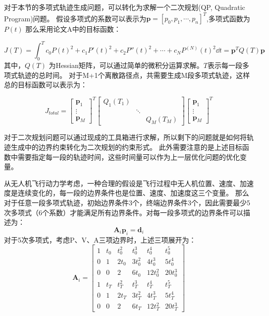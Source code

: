 对于本节的多项式轨迹生成问题，可以转化为求解一个二次规划(QP, Quadratic Program)问题。
假设多项式的系数可以表示为$\bm{p} = [p_0, p_1, \cdots, p_n]^T$,多项式函数为$P(t)$ 那么采用论文A中的目标函数：

\begin{equation}
    J(T) = \int_0^T c_0 P(t)^2 + c_1 P'(t)^2 + c_2 P''(t)^2 + \cdots + c_N P^{(N)}(t)^2 \dd t = \bm{p}^T Q(T) \bm{p}
\end{equation}
其中，$Q(T)$ 为Hessian矩阵，可以通过简单的微积分运算求解。$T$表示每一段多项式轨迹的总时间。
对于M+1个离散路径点，共需要生成M段多项式轨迹，这样总的目标函数可以表示为：

\begin{equation}
J_{total} = \begin{bmatrix} \bm{p}_1 \\ \vdots \\ \bm{p}_M \end{bmatrix}^T 
 \begin{bmatrix} Q_1(T_1) & & \\ & \ddots & \\ & & Q_M(T_M) \end{bmatrix}
 \begin{bmatrix} \bm{p}_1 \\ \vdots \\ \bm{p}_M \end{bmatrix}^T 
\end{equation}

对于二次规划问题可以通过现成的工具箱进行求解，所以剩下的问题就是如何将轨迹生成中的边界约束转化为二次规划的约束形式。
{\color{red}此外需要注意的是上述目标函数中需要指定每一段的轨迹时间，这些时间量可以作为上一层优化问题的优化变量。}

从无人机飞行动力学考虑，一种合理的假设是飞行过程中无人机位置、速度、加速度是连续变化的，每一段的边界条件也是位置、速度、加速度这三个变量。
那么对于任意一段多项式轨迹，初始边界条件3个，终端边界条件3个，因此需要最少5次多项式（6个系数）才能满足所有边界条件。对每一段多项式的边界条件可以描述为：
\begin{equation}
    \bm{A}_i \bm{p}_i = \bm{d}_i
\end{equation}
对于5次多项式，考虑P、V、A三项边界时，上述三项展开为：
\begin{equation}
    \bm{A}_i = \begin{bmatrix}
        1   & t_0   & t_0^2     & t_0^3     & t_0^4     & t_0^5 \\
        0   & 1     & 2 t_0     & 3 t_0^2   & 4 t_0^3   & 5 t_0^4 \\
        0   & 0     & 2         & 6 t_0     & 12 t_0^2  & 20 t_0^3 \\
        1   & t_T   & t_T^2     & t_T^3     & t_T^4     & t_T^5 \\
        0   & 1     & 2 t_T     & 3 t_T^2   & 4 t_T^3   & 5 t_T^4 \\
        0   & 0     & 2         & 6 t_T     & 12 t_T^2  & 20 t_T^3 
    \end{bmatrix}
\end{equation}

